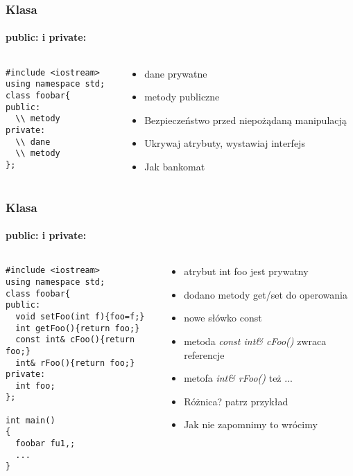 \documentclass[10pt]{beamer}
\begin{document}
\begin{frame}[fragile]
  \frametitle{Klasa}
  \framesubtitle{public: i private:}
  \begin{columns}
    \begin{column}{0.48\textwidth}
\begin{lstlisting}
#include <iostream>
using namespace std;
class foobar{
public:
  \\ metody
private:
  \\ dane 
  \\ metody
};

\end{lstlisting}
    \end{column}
    \begin{column}{0.48\textwidth}
      \begin{itemize}
        \item dane prywatne
        \item metody publiczne
        \item Bezpieczeństwo przed niepożądaną manipulacją
        \item Ukrywaj atrybuty, wystawiaj interfejs
        \item Jak bankomat
      \end{itemize}
    \end{column}
  \end{columns}
\end{frame}

\begin{frame}[fragile]
  \frametitle{Klasa}
  \framesubtitle{public: i private:}
  \begin{columns}
    \begin{column}{0.48\textwidth}
\begin{lstlisting}
#include <iostream>
using namespace std;
class foobar{
public:
  void setFoo(int f){foo=f;}
  int getFoo(){return foo;}
  const int& cFoo(){return foo;}
  int& rFoo(){return foo;}
private:
  int foo;
};

int main()
{
  foobar fu1,;
  ...
}
\end{lstlisting}
    \end{column}
    \begin{column}{0.48\textwidth}
      \begin{itemize}
        \item atrybut int foo jest prywatny
        \item dodano metody get/set do operowania
        \item nowe słówko const
        \item metoda \textit{const int\& cFoo()} zwraca referencje
        \item metofa \textit{int\& rFoo()} też ...
        \item Różnica? patrz przykład
        \item Jak nie zapomnimy to wrócimy
      \end{itemize}
    \end{column}
  \end{columns}
\end{frame}
\end{document}
